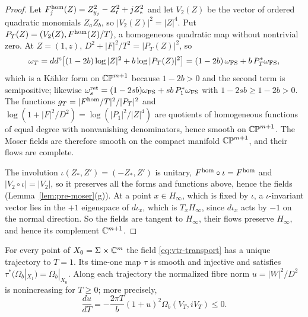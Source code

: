 \begin{proof}
Let $F^{\rm hom}_j(Z)=Z_{y_j}^2-Z_t^2+jZ_*^2$ and let $V_2(Z)$ be the vector of ordered quadratic monomials $Z_aZ_b$, so
$|V_2(Z)|^2=|Z|^4$. Put $P_T(Z)=(V_2(Z),F^{\rm hom}(Z)/T)$, a homogeneous quadratic map without nontrivial zero. At $Z=(1,z)$,
$D^2+|F|^2/T^2=|P_T(Z)|^2$, so
\[
 \omega_T=dd^c\bigl[(1-2b)\log|Z|^2+b\log|P_T(Z)|^2\bigr]=(1-2b)\,\omega_{\rm FS}+b\,P_T^*\omega_{\rm FS},
\]
which is a Kähler form on $\mathbb{CP}^{m+1}$ because $1-2b>0$ and the second term is semipositive; likewise
$\omega^{\rm ret}_s=(1-2sb)\omega_{\rm FS}+sb\,P_1^*\omega_{\rm FS}$ with $1-2sb\ge1-2b>0$. The functions
$g_T=|F^{\rm hom}/T|^2/|P_T|^2$ and $\log(1+|F|^2/D^2)=\log(|P_1|^2/|Z|^4)$ are quotients of homogeneous functions of equal
degree with nonvanishing denominators, hence smooth on $\mathbb{CP}^{m+1}$. The Moser fields are therefore smooth on the compact
manifold $\mathbb{CP}^{m+1}$, and their flows are complete.

The involution $\iota(Z_*,Z')=(-Z_*,Z')$ is unitary, $F^{\rm hom}\circ\iota=F^{\rm hom}$ and $|V_2\circ\iota|=|V_2|$, so it preserves all the forms
and functions above, hence the fields (Lemma~\ref{lem:pre-moser}(g)). At a point $x\in H_\infty$, which is fixed by $\iota$, a
$\iota$-invariant vector lies in the $+1$ eigenspace of $d\iota_x$, which is $T_xH_\infty$, since $d\iota_x$ acts by $-1$ on the normal
direction. So the fields are tangent to $H_\infty$, their flows preserve $H_\infty$, and hence its complement $\mathbb{C}^{m+1}$.
\end{proof}

\begin{proposition}\label{prop:vtr-transport}
For every point of $X_0=\Sigma\times\mathbb{C}^m$ the field \eqref{eq:vtr-transport} has a unique trajectory to $T=1$.
Its time-one map $\tau$ is smooth and injective and satisfies
$\tau^*(\Omega_b|_{X_1})=\Omega_b|_{X_0}$.
Along each trajectory the normalized fibre norm $u=|W|^2/D^2$ is nonincreasing for $T\ge0$; more precisely,
\[
 \frac{du}{dT}=-\frac{2\pi T}{b}(1+u)^2\Omega_b(V_T,iV_T)\le0.
\]
\end{proposition}

